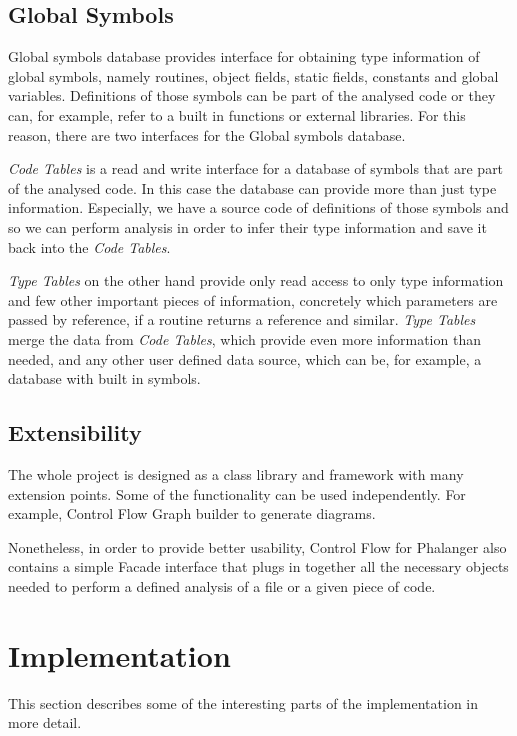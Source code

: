     \subsection{Global Symbols}
    Global symbols database provides interface for 
    obtaining type information of global symbols, 
    namely routines, object fields, static fields, constants 
    and global variables. Definitions of those symbols can be 
    part of the analysed code or they can, for example, refer 
    to a built in functions or external libraries. 
    For this reason, there are two interfaces 
    for the Global symbols database. 
    
    \emph{Code Tables} is a read and write interface for 
    a database of symbols that are part of the analysed code.     
    In this case the database can provide more than just type 
    information. Especially, we have a source code of definitions 
    of those symbols and so we can perform analysis in order to 
    infer their type information and save it back into 
    the \emph{Code Tables}.
    
    \emph{Type Tables} on the other hand provide only read
    access to only type information and few other important 
    pieces of information, concretely which parameters are 
    passed by reference, if a routine returns a reference 
    and similar. \emph{Type Tables} merge the data from 
    \emph{Code Tables}, which provide even more information 
    than needed, and any other user defined data source, 
    which can be, for example, a database with built in symbols.    
        
    \subsection{Extensibility}
    The whole project is designed as a class library and 
    framework with many extension points. Some of the 
    functionality can be used independently. For example, 
    Control Flow Graph builder to generate diagrams.
    
    Nonetheless, in order to provide better usability, 
    Control Flow for Phalanger also contains 
    a simple Facade interface that plugs in together all 
    the necessary objects needed to perform a defined 
    analysis of a file or a given piece of code.
    
    \section{Implementation}
    This section describes some of the interesting parts of the 
    implementation in more detail.
    
